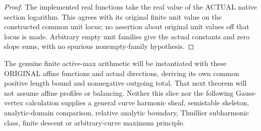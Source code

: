 \begin{proof}
The implemented real functions take the real value of the ACTUAL native
section logarithm. This agrees with its original finite unit value on the
constructed common unit locus; no assertion about original unit values off
that locus is made. Arbitrary empty unit families give the actual constants
and zero slope sums, with no spurious nonempty-family hypothesis.
\end{proof}

\begin{remark}
The genuine finite active-max arithmetic will be instantiated with these
ORIGINAL affine functions and actual directions, deriving its own common
positive length bound and nonnegative outgoing total. That next theorem
will not assume affine profiles or balancing. Neither this slice nor the
following Gauss-vertex calculation supplies a general curve harmonic sheaf,
semistable skeleton, analytic-domain comparison, relative analytic boundary,
Thuillier subharmonic class, finite descent or arbitrary-curve maximum principle.
\end{remark}
